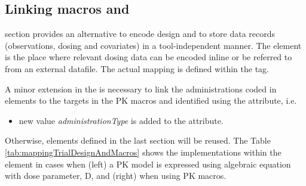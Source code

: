 \subsection{Linking macros and }
\label{subsec:LinkingMacrosTrialDesign}
 section provides an alternative to encode design and to store 
data records (observations, dosing and covariates) in a tool-independent manner. 
The  element is the place where relevant dosing data can 
be encoded inline or be referred to from an external datafile. The actual mapping 
is defined within the  tag.

A minor extension in the  is necessary to link the administrations coded
in  elements  to the targets in the PK macros and identified using the 
 attribute, i.e.
\begin{itemize}
\item
new value \textit{administrationType} is added to the  attribute.
\end{itemize}
Otherwise, elements defined in the last section will be reused. The Table 
\ref{tab:mappingTrialDesignAndMacros} shows the implementations within the 
 element in cases when (left) a PK model is expressed using 
algebraic equation with dose parameter, D, and (right) when using PK macros.
